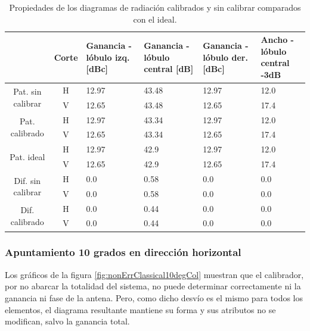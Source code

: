 \begin{table}[H]
  \footnotesize
  \centering
  \begin{tabular}{|c|c|p{2cm}|p{2.5cm}|p{2.5cm}|p{2.5cm}|}
    \cline{2-6}
    \multicolumn{1}{c|}{} & Corte & Ganancia - lóbulo izq. [dBc] & Ganancia - lóbulo central [dB] &
    Ganancia - lóbulo der. [dBc] & Ancho - lóbulo central -3dB \tabularnewline\hline
    \multirow{2}{2cm}{Pat. sin calibrar} & H & 12.97 & 43.48 & 12.97 & 12.0 \tabularnewline\cline{2-6}
     & V & 12.65 & 43.48 & 12.65 & 17.4 \tabularnewline\hline
    \multirow{2}{2cm}{Pat. calibrado} & H & 12.97 & 43.34 & 12.97 & 12.0 \tabularnewline\cline{2-6}
     & V & 12.65 & 43.34 & 12.65 & 17.4 \tabularnewline\hline
    \multirow{2}{2cm}{Pat. ideal} & H & 12.97 & 42.9 & 12.97 & 12.0 \tabularnewline\cline{2-6}
     & V & 12.65 & 42.9 & 12.65 & 17.4 \tabularnewline\hline
    \multirow{2}{2cm}{Dif. sin calibrar} & H & 0.0 & 0.58 & 0.0 & 0.0\tabularnewline\cline{2-6}
     & V & 0.0 & 0.58 & 0.0 & 0.0 \tabularnewline\hline
    \multirow{2}{2cm}{Dif. calibrado} & H & 0.0 & 0.44 & 0.0 & 0.0 \tabularnewline\cline{2-6}
     & V & 0.0 & 0.44 & 0.0 & 0.0 \tabularnewline\hline
  \end{tabular}
  \caption{Propiedades de los diagramas de radiación calibrados y sin calibrar comparados con el ideal.}
  \label{tab:nonErrClassical0deg}
\end{table}

\subsubsection{Apuntamiento 10 grados en dirección horizontal}

Los gráficos de la figura \ref{fig:nonErrClassical10degCol} muestran que el calibrador, por no abarcar la totalidad del sistema,
no puede determinar correctamente ni la ganancia ni fase de la antena. Pero, como dicho desvío es el mismo para todos los elementos,
el diagrama resultante mantiene su forma y sus atributos no se modifican, salvo la ganancia total.

